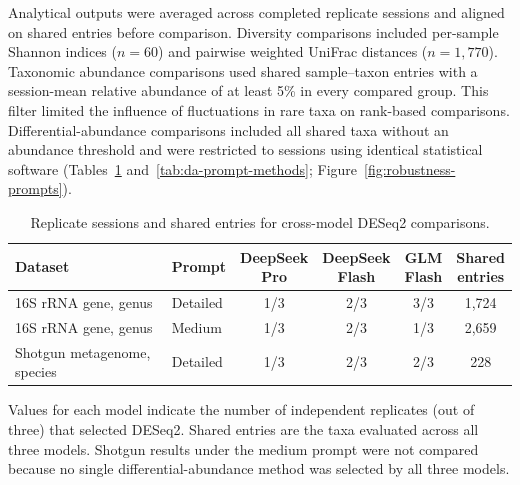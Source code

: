 \clearpage
Analytical outputs were averaged across completed replicate sessions and aligned
on shared entries before comparison. Diversity comparisons included per-sample
Shannon indices ($n = 60$) and pairwise weighted UniFrac distances ($n =
1{,}770$). Taxonomic abundance comparisons used shared sample--taxon entries
with a session-mean relative abundance of at least 5\% in every compared group.
This filter limited the influence of fluctuations in rare taxa on rank-based
comparisons. Differential-abundance comparisons included all shared taxa without
an abundance threshold and were restricted to sessions using identical
statistical software (Tables~\ref{tab:da-model-methods}
and~\ref{tab:da-prompt-methods}; Figure~\ref{fig:robustness-prompts}).

\begin{table}[H]
\centering
\caption{Replicate sessions and shared entries for cross-model DESeq2
  comparisons.}
\label{tab:da-model-methods}
\normalsize
\setlength{\tabcolsep}{5pt}
\renewcommand{\arraystretch}{1.12}
\begin{tabularx}{\linewidth}{@{}>{\raggedright\arraybackslash}Xlcccc@{}}
\toprule
Dataset & Prompt
  & \shortstack{DeepSeek\\Pro}
  & \shortstack{DeepSeek\\Flash}
  & \shortstack{GLM\\Flash}
  & \shortstack{Shared\\entries} \\
\midrule
16S rRNA gene, genus & Detailed & 1/3 & 2/3 & 3/3 & 1,724 \\
16S rRNA gene, genus & Medium & 1/3 & 2/3 & 1/3 & 2,659 \\
Shotgun metagenome, species & Detailed & 1/3 & 2/3 & 2/3 & 228 \\
\bottomrule
\end{tabularx}
\par\vspace{0.4em}
{\normalsize Values for each model indicate the number of independent replicates
  (out of three) that selected DESeq2. Shared entries are the taxa evaluated
  across all three models. Shotgun results under the medium prompt were not
  compared because no single differential-abundance method was selected by all
  three models.}
\end{table}

